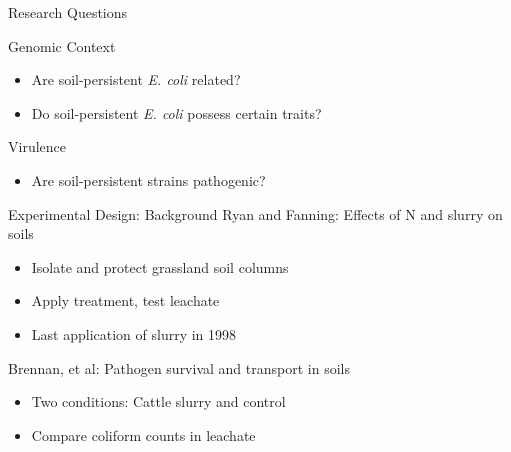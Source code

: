 \documentclass[17pt,aspectratio=169]{beamer}
\begin{document}

\begin{frame}[label={sec:orge334fb6}]{Research Questions}
\begin{block}{Genomic Context}
\begin{itemize}
\item Are soil-persistent \emph{E. coli} related?
\item Do soil-persistent \emph{E. coli} possess certain traits?
\end{itemize}
\end{block}
\begin{block}{Virulence}
\begin{itemize}
\item Are soil-persistent strains pathogenic?
\end{itemize}
\end{block}
\end{frame}

\begin{frame}[label={sec:org0836042}]{Experimental Design: Background}
Ryan and Fanning: Effects of N and slurry on soils
\begin{itemize}
\item Isolate and protect grassland soil columns
\item Apply treatment, test leachate
\item Last application of slurry in 1998
\end{itemize}
Brennan, et al: Pathogen survival and transport in soils
\begin{itemize}
\item Two conditions: Cattle slurry and  control
\item Compare coliform counts in leachate
\end{itemize}
\end{frame}
\end{document}
